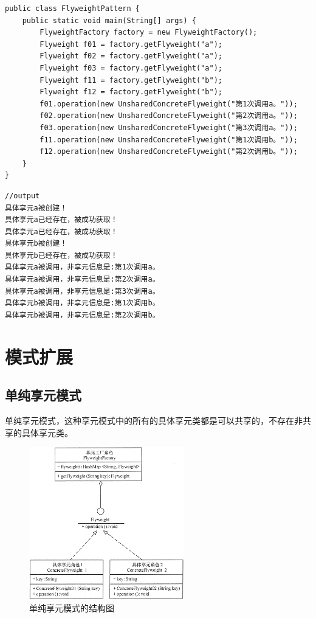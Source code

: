 \begin{lstlisting}
public class FlyweightPattern {
	public static void main(String[] args) {
		FlyweightFactory factory = new FlyweightFactory();
		Flyweight f01 = factory.getFlyweight("a");
		Flyweight f02 = factory.getFlyweight("a");
		Flyweight f03 = factory.getFlyweight("a");
		Flyweight f11 = factory.getFlyweight("b");
		Flyweight f12 = factory.getFlyweight("b");
		f01.operation(new UnsharedConcreteFlyweight("第1次调用a。"));
		f02.operation(new UnsharedConcreteFlyweight("第2次调用a。"));
		f03.operation(new UnsharedConcreteFlyweight("第3次调用a。"));
		f11.operation(new UnsharedConcreteFlyweight("第1次调用b。"));
		f12.operation(new UnsharedConcreteFlyweight("第2次调用b。"));
	}
}
\end{lstlisting}
\begin{lstlisting}
//output
具体享元a被创建！
具体享元a已经存在，被成功获取！
具体享元a已经存在，被成功获取！
具体享元b被创建！
具体享元b已经存在，被成功获取！
具体享元a被调用，非享元信息是:第1次调用a。
具体享元a被调用，非享元信息是:第2次调用a。
具体享元a被调用，非享元信息是:第3次调用a。
具体享元b被调用，非享元信息是:第1次调用b。
具体享元b被调用，非享元信息是:第2次调用b。
\end{lstlisting}
\section{模式扩展}
\subsection{单纯享元模式}
单纯享元模式，这种享元模式中的所有的具体享元类都是可以共享的，不存在非共享的具体享元类。
\begin{figure}[!h]
	\centering
	\includegraphics[width=0.6\textwidth]{image/20-3}
	\caption{单纯享元模式的结构图}
\end{figure}
